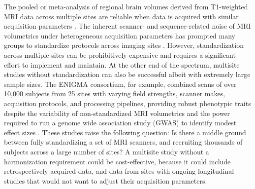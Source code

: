 The pooled  or meta-analysis of regional brain volumes derived from T1-weighted MRI data across multiple sites are reliable when data is acquired with similar acquisition parameters \cite{cannon2014,multicenter01,freesurferReliability}. The inherent scanner- and sequence-related noise of MRI volumetrics under heterogeneous acquisition parameters has prompted many groups to standardize protocols across imaging sites \cite{cannon2014,adniharmonize,ADNIReview}. However, standardization across multiple sites can be prohibitively expensive and requires a significant effort to implement and maintain. %
At the other end of the spectrum, multisite studies without standardization can also be successful albeit with extremely large sample sizes. The ENIGMA consortium, for example, combined scans of over 10,000 subjects from 25 sites with varying field strengths, scanner makes, acquisition protocols, and processing pipelines, providing robust phenotypic traits despite the variability of non-standardized MRI volumetrics and the power required to run a genome wide association study (GWAS) to identify modest effect sizes \cite{thompson2014enigma}. These studies raise the following question: Is there a middle ground between fully standardizing a set of MRI scanners, and recruiting thousands of subjects across a large number of sites? A multisite study without a harmonization requirement could be cost-effective, because it could include retrospectively acquired data, and data from sites with ongoing longitudinal studies that would not want to adjust their acquisition parameters.